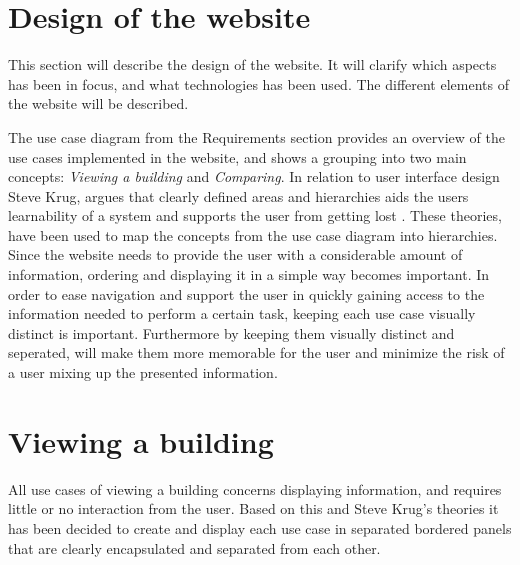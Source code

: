 \section{Design of the website}
This section will describe the design of the website. It will clarify which aspects has been in focus, and what technologies has been used. The different elements of the website will be described.

The use case diagram from the Requirements section provides an overview of the use cases implemented in the website, and shows a grouping into two main concepts: \emph{Viewing a building} and \emph{Comparing}. In relation to user interface design Steve Krug, argues that clearly defined areas and hierarchies aids the users learnability of a system and supports the user from getting lost \cite{interaction}. These theories, have been used to map the concepts from the use case diagram into hierarchies. Since the website needs to provide the user with a considerable amount of information, ordering and displaying it in a simple way becomes important. In order to ease navigation and support the user in quickly gaining access to the information needed to perform a certain task, keeping each use case visually distinct is important. Furthermore by keeping them visually distinct and seperated, will make them more memorable for the user and minimize the risk of a user mixing up the presented information.
\section*{Viewing a building}
All use cases of viewing a building concerns displaying information, and requires little or no interaction from the user. Based on this and Steve Krug's theories it has been decided to create and display each use case in separated bordered panels that are clearly encapsulated and separated from each other.
